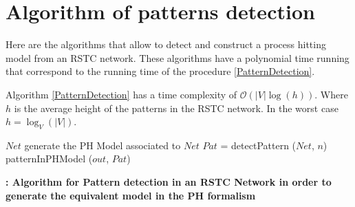 \appendix
 \section{Algorithm of patterns detection}

 Here are the algorithms that allow to detect and construct a process hitting model from an RSTC network.
 These algorithms have a polynomial time running that correspond to the running time of the procedure \ref{PatternDetection}.
 
 \begin{proposition}
  Algorithm \ref{PatternDetection} has a time complexity of $\mathcal{O}(|V|\log{}(h))$. 
  Where $h$ is the average height of the patterns in the RSTC network. In the worst case 
  $h = \log_{V}(|V|)$.
 \end{proposition}

 
 
 

\begin{algorithm}
\begin{algorithmic}[1]
\REQUIRE $Net$ 
\ENSURE generate the PH Model associated to $Net$
\STATE $Pat$ = detectPattern ($Net$, $n$)
\STATE patternInPHModel ($out$, $Pat$)

\ENDFOR
\end{algorithmic}
\caption{\bf: Algorithm for Pattern detection in an RSTC Network in order to generate the equivalent model in the PH formalism}
\label{automaticGenerationOfPHModel}
\end{algorithm}



